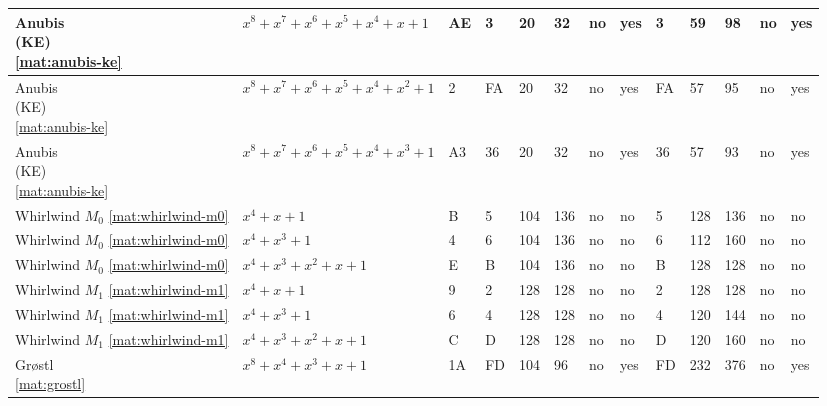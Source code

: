 \begin{tiny}
\begin{longtable}{|l|l|l|l|l|l|l|l|l|l|l|l|l|}
\shortstack{Anubis \\ (KE) \\ \eqref{mat:anubis-ke}} & $x^8 + x^7 + x^6 + x^5 + x^4 + x + 1$ & AE & 3 & 20 & 32 & no & yes & 3 & 59 & 98 & no & yes \\ \hline
\shortstack{Anubis \\ (KE) \\ \eqref{mat:anubis-ke}} & $x^8 + x^7 + x^6 + x^5 + x^4 + x^2 + 1$ & 2 & FA & 20 & 32 & no & yes & FA & 57 & 95 & no & yes \\ \hline
\shortstack{Anubis \\ (KE) \\ \eqref{mat:anubis-ke}} & $x^8 + x^7 + x^6 + x^5 + x^4 + x^3 + 1$ & A3 & 36 & 20 & 32 & no & yes & 36 & 57 & 93 & no & yes \\ \hline
\shortstack{Whirlwind \\ $M_0$ \\ \eqref{mat:whirlwind-m0}} & $x^4 + x + 1$ & B & 5 & 104 & 136 & no & no & 5 & 128 & 136 & no & no \\ \hline
\shortstack{Whirlwind \\ $M_0$ \\ \eqref{mat:whirlwind-m0}} & $x^4 + x^3 + 1$ & 4 & 6 & 104 & 136 & no & no & 6 & 112 & 160 & no & no \\ \hline
\shortstack{Whirlwind \\ $M_0$ \\ \eqref{mat:whirlwind-m0}} & $x^4 + x^3 + x^2 + x + 1$ & E & B & 104 & 136 & no & no & B & 128 & 128 & no & no \\ \hline
\shortstack{Whirlwind \\ $M_1$ \\ \eqref{mat:whirlwind-m1}} & $x^4 + x + 1$ & 9 & 2 & 128 & 128 & no & no & 2 & 128 & 128 & no & no \\ \hline
\shortstack{Whirlwind \\ $M_1$ \\ \eqref{mat:whirlwind-m1}} & $x^4 + x^3 + 1$ & 6 & 4 & 128 & 128 & no & no & 4 & 120 & 144 & no & no \\ \hline
\shortstack{Whirlwind \\ $M_1$ \\ \eqref{mat:whirlwind-m1}} & $x^4 + x^3 + x^2 + x + 1$ & C & D & 128 & 128 & no & no & D & 120 & 160 & no & no \\ \hline
\shortstack{Gr{\o}stl \\ \eqref{mat:grostl}} & $x^8 + x^4 + x^3 + x + 1$ & 1A & FD & 104 & 96 & no & yes & FD & 232 & 376 & no & yes \\ \hline

\end{longtable}
\end{tiny}
